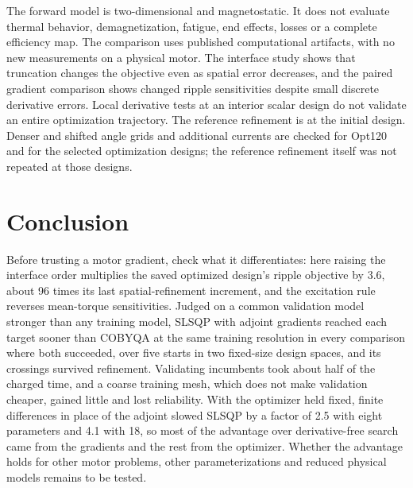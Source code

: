 \documentclass{anvil-paper}
\begin{document}
The forward model is two-dimensional and magnetostatic. It does not evaluate
thermal behavior, demagnetization, fatigue, end effects, losses or a
complete efficiency map. The comparison uses published computational
artifacts, with no new measurements on a physical motor. The interface
study shows that truncation changes the objective even as spatial error
decreases, and the paired gradient comparison shows changed ripple
sensitivities despite small discrete derivative errors. Local derivative
tests at an interior scalar design do not validate an entire optimization
trajectory. The reference refinement is at the initial design. Denser and
shifted angle grids and additional currents are checked for Opt120 and for
the selected optimization designs; the reference refinement itself was not
repeated at those designs.

\section{Conclusion}
Before trusting a motor gradient, check what it differentiates: here
raising the interface order multiplies the saved optimized design's ripple
objective by 3.6, about 96 times its last spatial-refinement increment, and
the excitation rule reverses mean-torque sensitivities. Judged on a common
validation model stronger than any training model, SLSQP with adjoint
gradients reached each target sooner than COBYQA at the same training
resolution in every comparison where both succeeded, over five starts in
two fixed-size design spaces, and its crossings survived refinement.
Validating incumbents took about half of the charged time, and a coarse
training mesh, which does not make validation cheaper, gained little and
lost reliability. With the optimizer held fixed, finite differences in
place of the adjoint slowed SLSQP by a factor of 2.5 with eight parameters
and 4.1 with 18, so most of the advantage over derivative-free search came
from the gradients and the rest from the optimizer. Whether the advantage holds for other motor problems, other
parameterizations and reduced physical models remains to be tested.
\end{document}
